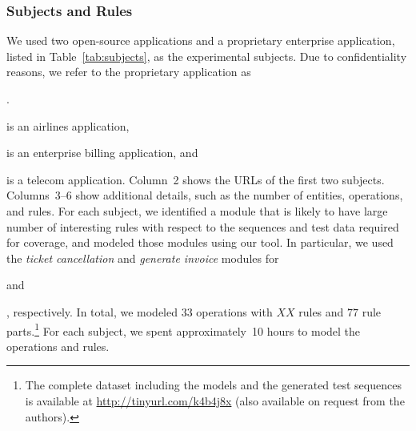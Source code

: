 
\subsubsection{Subjects and Rules}

We used two open-source applications and a proprietary enterprise application,
listed in Table~\ref{tab:subjects}, as the experimental subjects. Due to
confidentiality reasons, we refer to the proprietary application as
\subject{App}. \subject{Cebu-pacific} is an airlines application,
\subject{jBilling} is an enterprise billing application, and \subject{App} is a
telecom application. Column~2 shows the URLs of the first two subjects.
Columns~3--6 show additional details, such as the number of entities,
operations, and rules. For each subject, we identified a module that is likely
to have large number of interesting rules with respect to the sequences and test
data required for coverage, and modeled those modules using our tool. In
particular, we used the \textit{ticket cancellation} and \textit{generate
  invoice} modules for \subject{Cebu-pacific} and \subject{jBilling},
respectively. In total, we modeled $33$ operations with $XX$ rules and $77$ rule
parts.\footnote{\small The complete dataset including the models and the
  generated test sequences is available at \url{http://tinyurl.com/k4b4j8x}
  (also available on request from the authors).} For each subject, we spent
approximately~10 hours to model the operations and rules.

